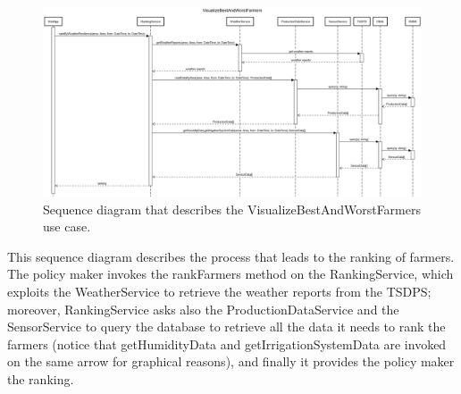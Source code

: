 \documentclass{article}
\begin{document}
\newpage
\begin{figure}[H]
   \centering
   \includegraphics[scale=0.20]{diagrams/sequence diagrams/VisualizeBestAndWorstFarmers.png}
    \caption{Sequence diagram that describes the VisualizeBestAndWorstFarmers use case.}
\end{figure}
This sequence diagram describes the process that leads to the ranking of farmers. The policy maker invokes the rankFarmers method on the RankingService, which exploits the WeatherService to retrieve the weather reports from the TSDPS; moreover, RankingService asks also the ProductionDataService and the SensorService to query the database to retrieve all the data it needs to rank the farmers (notice that getHumidityData and getIrrigationSystemData are invoked on the same arrow for graphical reasons), and finally it provides the policy maker the ranking.
\end{document}
